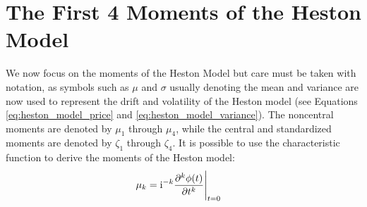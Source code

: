 \section{The First 4 Moments of the Heston Model}

We now focus on the moments of the Heston Model but care must be taken with notation, as symbols such as $\mu$ and $\sigma$ usually denoting the mean and variance are now used to represent the drift and volatility of the Heston model (see Equations \eqref{eq:heston_model_price} and \eqref{eq:heston_model_variance}). The noncentral moments are denoted by $\mu_1$ through $\mu_4$, while the central and standardized moments are denoted by $\zeta_1$ through $\zeta_4$. It is possible to use the characteristic function to derive the moments of the Heston model:
\begin{align}
    \mu_k &= \mathrm{i}^{-k}\frac{\partial^k\phi(t)}{\partial t^k}\Bigg|_{t=0} \notag
\end{align}

